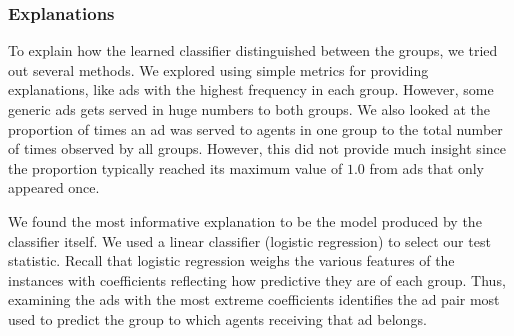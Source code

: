 \documentclass[10pt, onecolumn]{report}
\begin{document}
\subsubsection{Explanations}%
To explain how the learned classifier distinguished between the groups, 
we tried out several methods. 
We explored using simple metrics for providing explanations, like ads 
with the highest frequency in each group. However, some generic ads 
gets served in huge numbers to both groups. We also looked at the 
proportion of times an ad was served to agents in one group to the total 
number of times observed by all groups.  However, this did not provide 
much insight since the proportion typically reached its maximum value of 
$1.0$ from ads that only appeared once. 

We found the most informative explanation to be the model produced 
by the classifier itself. 
We used a linear classifier (logistic regression) to select our test statistic.
Recall that logistic regression weighs the various features of the instances 
with coefficients reflecting how predictive they are of each group.  
Thus, examining the ads with the most extreme coefficients identifies 
the ad pair most used to predict the group to which agents receiving 
that ad belongs.

%


\end{document}

